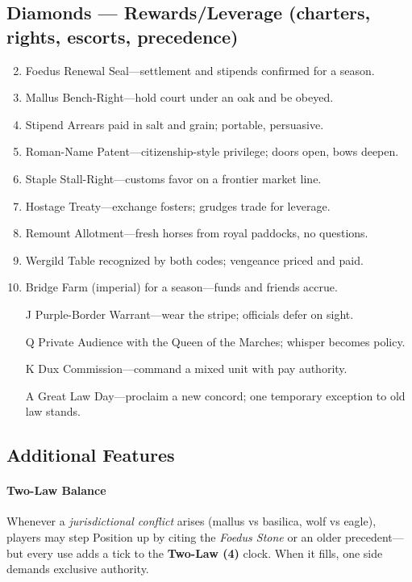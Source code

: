 \subsection*{Diamonds --- Rewards/Leverage (charters, rights, escorts, precedence)}
\label{sec:vilikari-rewards}
\begin{enumerate}
\setcounter{enumi}{1}
\item Foedus Renewal Seal---settlement and stipends confirmed for a season.
\item Mallus Bench-Right---hold court under an oak and be obeyed.
\item Stipend Arrears paid in salt and grain; portable, persuasive.
\item Roman-Name Patent---citizenship-style privilege; doors open, bows deepen.
\item Staple Stall-Right---customs favor on a frontier market line.
\item Hostage Treaty---exchange fosters; grudges trade for leverage.
\item Remount Allotment---fresh horses from royal paddocks, no questions.
\item Wergild Table recognized by both codes; vengeance priced and paid.
\item Bridge Farm (imperial) for a season---funds and friends accrue.
\item[J] Purple-Border Warrant---wear the stripe; officials defer on sight.
\item[Q] Private Audience with the Queen of the Marches; whisper becomes policy.
\item[K] Dux Commission---command a mixed unit with pay authority.
\item[A] Great Law Day---proclaim a new concord; one temporary exception to old law stands.
\end{enumerate}

\subsection*{Additional Features}
\label{sec:vilikari-features}
\paragraph{Two-Law Balance}
Whenever a \emph{jurisdictional conflict} arises (mallus vs basilica, wolf vs eagle), players may step Position up by citing the \emph{Foedus Stone} or an older precedent—but every use adds a tick to the \textbf{Two-Law (4)} clock. When it fills, one side demands exclusive authority.

